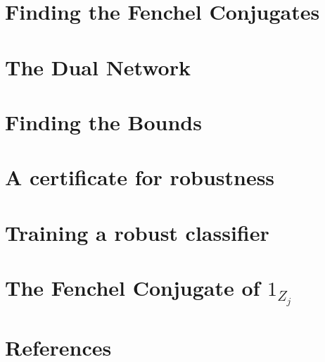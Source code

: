 \documentclass{amsart}
\begin{document}
\pagebreak

\section{Finding the Fenchel Conjugates}



\pagebreak

\section{The Dual Network}



\pagebreak

\section{Finding the Bounds}



\pagebreak

\section{A certificate for robustness}



\pagebreak

\section{Training a robust classifier}



\pagebreak

\section{The Fenchel Conjugate of \texorpdfstring{$1_{Z_j}$}{1\_Z\_j}}



\pagebreak

\section{References}



\pagebreak

\printbibliography
\end{document}
